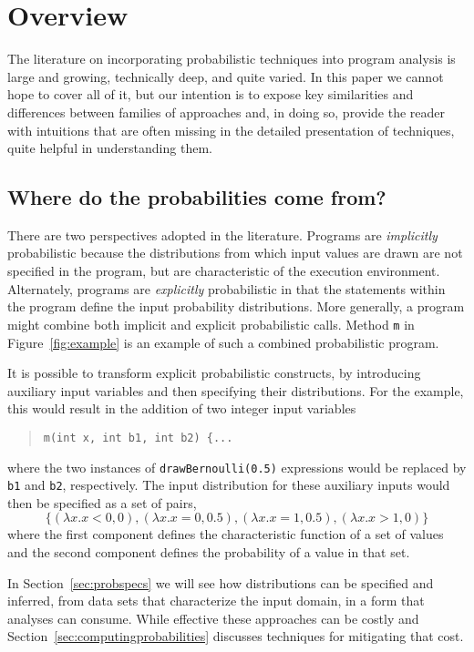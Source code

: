 \section{Overview}
\label{sec:overview}

The literature on incorporating probabilistic techniques into 
program analysis is large and growing, technically deep, and quite
varied.  In this paper we cannot hope to cover all of it, but our
intention is to expose key similarities and differences between 
families of approaches and, in doing so, provide the reader with
intuitions that are often missing in the detailed presentation of
techniques, quite helpful in understanding them.

\subsection{Where do the probabilities come from?}
There are two perspectives adopted in the literature.
Programs are \textit{implicitly} probabilistic because the distributions
from which input values are drawn are not specified in the program,
but are characteristic of the execution environment.
Alternately, programs are \textit{explicitly} probabilistic in 
that the statements
within the program define the input probability distributions.
More generally, a program might combine both implicit and explicit
probabilistic calls.  Method \texttt{m} in Figure~\ref{fig:example}
is an example of such a combined probabilistic program.

It is possible to transform explicit probabilistic constructs,
by introducing auxiliary input variables and then specifying
their distributions.   For the example, this would result
in the addition of two integer input variables 
\begin{quote}
\texttt{m(int x, int b1, int b2) \{...} 
\end{quote}
where the two instances of
\texttt{drawBernoulli(0.5)} expressions would be replaced
by \texttt{b1} and \texttt{b2}, respectively.  The input
distribution for these auxiliary inputs would then be specified
as a set of pairs,
\[
\{ (\lambda x.x<0,0), (\lambda x.x=0,0.5), (\lambda x.x=1,0.5), (\lambda x.x>1,0) \}
\]
where the first component defines the characteristic function
of a set of values and the second component defines the probability
of a value in that set.

In Section~\ref{sec:probspecs} we will see how distributions can
be specified and inferred, from data sets that characterize the
input domain, in a form that 
analyses can consume.  While effective these approaches can be
costly and Section~\ref{sec:computingprobabilities} discusses
techniques for mitigating that cost.

